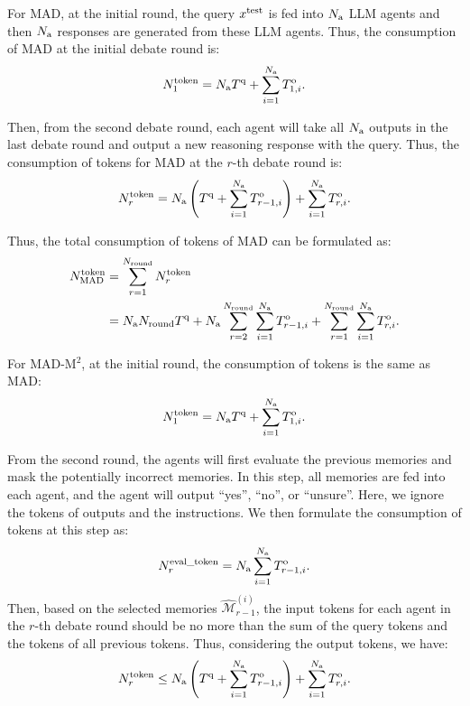 \documentclass{article} %
\newcommand{\methodname}{MAD-M$^2$}
\newcommand{\uprmvar}[2]{#1^{\rm #2}}
\theoremstyle{plain}
\begin{document}
For MAD, at the initial round, the query $\uprmvar{x}{test}$ is fed into $N_{\rm a}$ LLM agents and then $N_{\rm a}$ responses are generated from these LLM agents. Thus, the consumption of MAD at the initial debate round is:
\[
    \uprmvar{N}{token}_{1} = N_{\rm a}\uprmvar{T}{q} + \sum_{i=1}^{N_{\rm a}}\uprmvar{T}{o}_{1, i}.
\]

Then, from the second debate round, each agent will take all $N_{\rm a}$ outputs in the last debate round and output a new reasoning response with the query. Thus, the consumption of tokens for MAD at the $r$-th debate round is:
\[
    \uprmvar{N}{token}_{r} = N_{\rm a}\left(\uprmvar{T}{q}+\sum_{i=1}^{N_{\rm a}}\uprmvar{T}{o}_{r-1, i}\right)+\sum_{i=1}^{N_{\rm a}}\uprmvar{T}{o}_{r, i}.
\]

Thus, the total consumption of tokens of MAD can be formulated as:
\[
\begin{aligned}
    \uprmvar{N}{token}_{\rm MAD} &= \sum_{r=1}^{N_{\rm round}}\uprmvar{N}{token}_r\\
    &= N_{\rm a}N_{\rm round}\uprmvar{T}{q}  +  N_{\rm a}\sum_{r=2}^{N_{\rm round}}\sum_{i=1}^{N_{\rm a}}\uprmvar{T}{o}_{r-1, i}+\sum_{r=1}^{N_{\rm round}}\sum_{i=1}^{N_{\rm a}}\uprmvar{T}{o}_{r, i}.
\end{aligned}
\]

For \methodname, at the initial round, the consumption of tokens is the same as MAD:
\[
    \uprmvar{N}{token}_{1} = N_{\rm a}\uprmvar{T}{q} + \sum_{i=1}^{N_{\rm a}}\uprmvar{T}{o}_{1, i}.
\]

From the second round, the agents will first evaluate the previous memories and mask the potentially incorrect memories. In this step, all memories are fed into each agent, and the agent will output ``yes'', ``no'', or ``unsure''. Here, we ignore the tokens of outputs and the instructions. We then formulate the consumption of tokens at this step as:
\[
    \uprmvar{N}{eval\_token}_r = N_{\rm a}\sum_{i=1}^{N_{\rm a}}\uprmvar{T}{o}_{r-1, i}.
\]
Then, based on the selected memories $\widehat{\mathcal{M}}_{r-1}^{(i)}$, the input tokens for each agent in the $r$-th debate round should be no more than the sum of the query tokens and the tokens of all previous tokens. Thus, considering the output tokens, we have:
\[
    \uprmvar{N}{token}_{r} \leq N_{\rm a}\left(\uprmvar{T}{q}+\sum_{i=1}^{N_{\rm a}}\uprmvar{T}{o}_{r-1, i}\right)+\sum_{i=1}^{N_{\rm a}}\uprmvar{T}{o}_{r, i}.
\]
\end{document}
